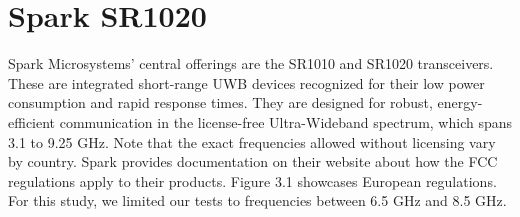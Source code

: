 \chapter{Spark SR1020}
\label{cha:spark}
Spark Microsystems' central offerings are the SR1010 and SR1020 transceivers. These are integrated short-range UWB devices recognized for their low power consumption and rapid response times. They are designed for robust, energy-efficient communication in the license-free Ultra-Wideband spectrum, which spans 3.1 to 9.25 GHz. Note that the exact frequencies allowed without licensing vary by country. Spark provides documentation on their website about how the FCC regulations apply to their products. Figure 3.1 showcases European regulations. For this study, we limited our tests to frequencies between 6.5 GHz and 8.5 GHz.

